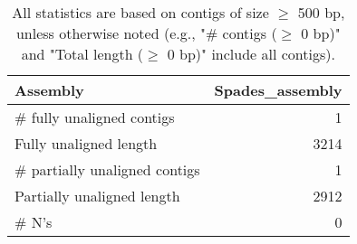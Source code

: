 \documentclass[12pt,a4paper]{article}
\begin{document}
\begin{table}[ht]
\begin{center}
\caption{All statistics are based on contigs of size $\geq$ 500 bp, unless otherwise noted (e.g., "\# contigs ($\geq$ 0 bp)" and "Total length ($\geq$ 0 bp)" include all contigs).}
\begin{tabular}{|l*{1}{|r}|}
\hline
Assembly & Spades\_assembly \\ \hline
\# fully unaligned contigs & 1 \\ \hline
Fully unaligned length & 3214 \\ \hline
\# partially unaligned contigs & 1 \\ \hline
Partially unaligned length & 2912 \\ \hline
\# N's & 0 \\ \hline
\end{tabular}
\end{center}
\end{table}
\end{document}
